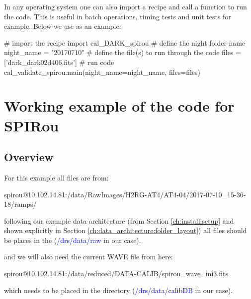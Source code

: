 In any operating system one can also import a recipe and call a function to run the code. This is useful in batch operations, timing tests and unit tests for example. Below we use \calDARK as an example:

\begin{pythonbox}
# import the recipe
import cal_DARK_spirou
# define the night folder name
night_name = "20170710"
# define the file(s) to run through the code
files = ['dark_dark02d406.fits']
# run code
cal_validate_spirou.main(night_name=night_name, files=files)
\end{pythonbox}

\clearpage
\newpage
\section{Working example of the code for SPIRou}
\label{chapter:using_the_drs:working_example}

\subsection{Overview}
\label{chapter:using_the_drs:working_example:overview}

For this example all files are from:
\begin{cmdbox}
spirou@10.102.14.81:/data/RawImages/H2RG-AT4/AT4-04/2017-07-10_15-36-18/ramps/
\end{cmdbox} 

\noindent following our example data architecture (from Section \ref{ch:install:setup} and shown explicitly in Section \ref{ch:data_architecture:folder_layout}) all files should be places in the  (\textcolor{blue}{/drs/data/raw} in our case).

\noindent and we will also need the current WAVE file from here:
\begin{cmdbox}
spirou@10.102.14.81:/data/reduced/DATA-CALIB/spirou_wave_ini3.fits
\end{cmdbox}

\noindent which needs to be placed in the  directory (\textcolor{blue}{/drs/data/calibDB} in our case).

